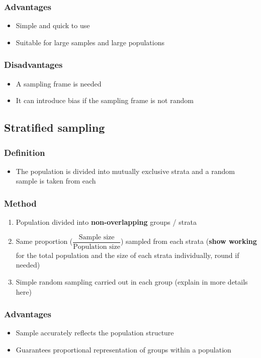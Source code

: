\subsubsection{Advantages}
\begin{itemize}
    \item Simple and quick to use
    \item Suitable for large samples and large populations
\end{itemize}
\subsubsection{Disadvantages}
\begin{itemize}
    \item A sampling frame is needed
    \item It can introduce bias if the sampling frame is not random
\end{itemize}
\subsection{Stratified sampling}
\subsubsection{Definition}
\begin{itemize}
    \item The population is divided into mutually exclusive strata and a random sample is taken from each
\end{itemize}
\subsubsection{Method}
\begin{enumerate}
    \item Population divided into \textbf{non-overlapping} groups / strata
    \item Same proportion ($\dfrac{\text{Sample size}}{\text{Population size}}$) sampled from each strata (\textbf{show working} for the total population and the size of each strata individually, round if needed)
    \item Simple random sampling carried out in each group (explain in more details here)
\end{enumerate}
\subsubsection{Advantages}
\begin{itemize}
    \item Sample accurately reflects the population structure
    \item Guarantees proportional representation of groups within a population
\end{itemize}
